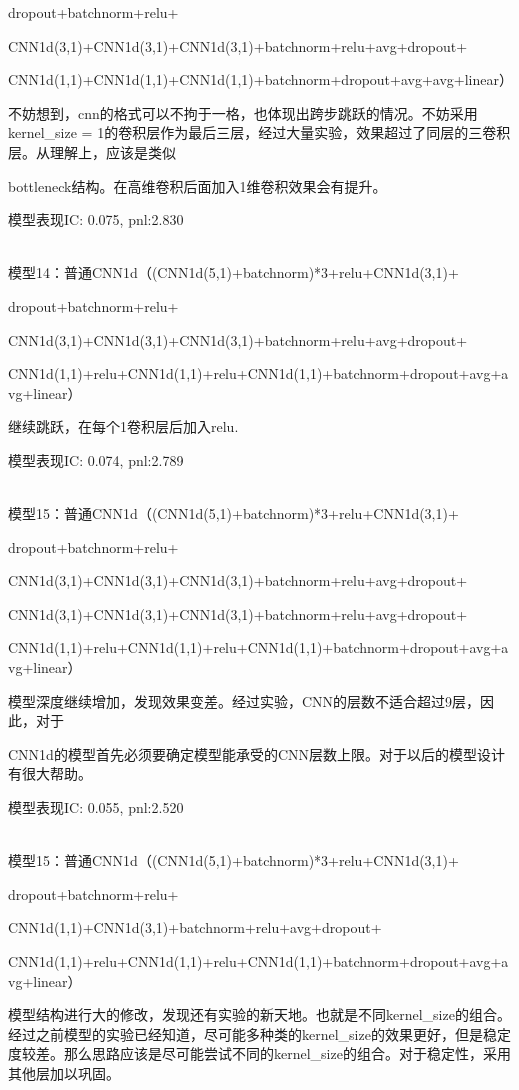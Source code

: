 \documentclass[11pt]{ctexart}
\begin{document}
dropout+batchnorm+relu+

CNN1d(3,1)+CNN1d(3,1)+CNN1d(3,1)+batchnorm+relu+avg+dropout+

CNN1d(1,1)+CNN1d(1,1)+CNN1d(1,1)+batchnorm+dropout+avg+avg+linear）

不妨想到，cnn的格式可以不拘于一格，也体现出跨步跳跃的情况。不妨采用kernel\_size = 1的卷积层作为最后三层，经过大量实验，效果超过了同层的三卷积层。从理解上，应该是类似\par bottleneck结构。在高维卷积后面加入1维卷积效果会有提升。

模型表现{\kaishu \small IC: 0.075, pnl:2.830}

~\\
模型14：普通CNN1d（(CNN1d(5,1)+batchnorm)*3+relu+CNN1d(3,1)+

dropout+batchnorm+relu+

CNN1d(3,1)+CNN1d(3,1)+CNN1d(3,1)+batchnorm+relu+avg+dropout+

CNN1d(1,1)+relu+CNN1d(1,1)+relu+CNN1d(1,1)+batchnorm+dropout+avg+avg+linear）

继续跳跃，在每个1卷积层后加入relu.

模型表现{\kaishu \small IC: 0.074, pnl:2.789}

~\\
模型15：普通CNN1d（(CNN1d(5,1)+batchnorm)*3+relu+CNN1d(3,1)+

dropout+batchnorm+relu+

CNN1d(3,1)+CNN1d(3,1)+CNN1d(3,1)+batchnorm+relu+avg+dropout+

CNN1d(3,1)+CNN1d(3,1)+CNN1d(3,1)+batchnorm+relu+avg+dropout+

CNN1d(1,1)+relu+CNN1d(1,1)+relu+CNN1d(1,1)+batchnorm+dropout+avg+avg+linear）

模型深度继续增加，发现效果变差。经过实验，CNN的层数不适合超过9层，因此，对于\par CNN1d的模型首先必须要确定模型能承受的CNN层数上限。对于以后的模型设计有很大帮助。

模型表现{\kaishu \small IC: 0.055, pnl:2.520}

~\\
模型15：普通CNN1d（(CNN1d(5,1)+batchnorm)*3+relu+CNN1d(3,1)+

dropout+batchnorm+relu+

CNN1d(1,1)+CNN1d(3,1)+batchnorm+relu+avg+dropout+

CNN1d(1,1)+relu+CNN1d(1,1)+relu+CNN1d(1,1)+batchnorm+dropout+avg+avg+linear）

模型结构进行大的修改，发现还有实验的新天地。也就是不同kernel\_size的组合。经过之前模型的实验已经知道，尽可能多种类的kernel\_size的效果更好，但是稳定度较差。那么思路应该是尽可能尝试不同的kernel\_size的组合。对于稳定性，采用其他层加以巩固。
\end{document}
